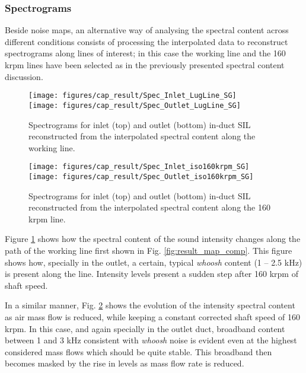 \subsubsection{Spectrograms}

Beside noise maps, an alternative way of analysing the spectral content across different conditions consists of processing the interpolated data to reconstruct spectrograms along lines of interest; in this case the working line and the 160 krpm lines have been selected as in the previously presented spectral content discussion.

\begin{figure}[tbh!]
\centering
\texttt{[image: figures/cap\_result/Spec\_Inlet\_LugLine\_SG]}\\[5mm]
\texttt{[image: figures/cap\_result/Spec\_Outlet\_LugLine\_SG]}
\caption{Spectrograms for inlet (top) and outlet (bottom) in-duct SIL reconstructed from the interpolated spectral content along the working line.}
\label{fig:result_LugLine_SG}
\end{figure}

\begin{figure}[tbh!]
\centering
\texttt{[image: figures/cap\_result/Spec\_Inlet\_iso160krpm\_SG]}\vspace{5mm}
\texttt{[image: figures/cap\_result/Spec\_Outlet\_iso160krpm\_SG]}
\caption{Spectrograms for inlet (top) and outlet (bottom) in-duct SIL reconstructed from the interpolated spectral content along the 160 krpm line.}
\label{fig:result_iso160krpm_SG}
\end{figure}

Figure \ref{fig:result_LugLine_SG} shows how the spectral content of the sound intensity changes along the path of the working line first shown in Fig. \ref{fig:result_map_comp}. This figure shows how, specially in the outlet, a certain, typical \emph{whoosh} content (1 -- 2.5 kHz) is present along the line. Intensity levels present a sudden step after 160 krpm of shaft speed.

In a similar manner, Fig. \ref{fig:result_iso160krpm_SG} shows the evolution of the intensity spectral content as air mass flow is reduced, while keeping a constant corrected shaft speed of 160 krpm. In this case, and again specially in the outlet duct, broadband content between 1 and 3 kHz consistent with \emph{whoosh} noise is evident even at the highest considered mass flows which should be quite stable. This broadband then becomes masked by the rise in levels as mass flow rate is reduced.

